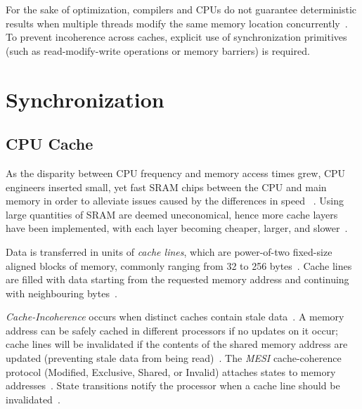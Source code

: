 For the sake of optimization, compilers and CPUs do not guarantee deterministic
results when multiple threads modify the same memory location
concurrently~\citep{drepper2007every}. To prevent incoherence across caches,
explicit use of synchronization primitives (such as read-modify-write
operations or memory barriers) is required.

\section{Synchronization}
\subsection{CPU Cache}
As the disparity between CPU frequency and memory access times grew, 
CPU engineers inserted small, yet fast SRAM chips between the CPU
and main memory in order to alleviate issues caused by the differences in speed
~\citep{cantrill2008real,drepper2007every,perfbook2021}. Using large
quantities of SRAM are deemed uneconomical, hence more cache layers
have been implemented, with each layer becoming cheaper, larger, and slower~\citep{drepper2007every,perfbook2021}.

Data is transferred in units of \emph{cache lines}, which are power-of-two
fixed-size aligned blocks of memory, commonly ranging from 32 to 256
bytes~\citep{perfbook2021_cacheline}. Cache lines are filled with data starting
from the requested memory address and continuing with neighbouring
bytes~\citep{perfbook2021_cacheline}.


\emph{Cache-Incoherence} occurs when distinct caches contain stale
data~\citep{herlihy2020art_cachecoherence}. A memory address
can be safely cached in different processors if no updates on it occur; 
cache lines will be invalidated if the contents of the shared memory address are
updated (preventing stale data from being
read)~\citep{herlihy2020art_cachecoherence}.
The \emph{MESI} cache-coherence protocol (Modified, Exclusive, Shared, or
Invalid) attaches states to memory
addresses~\citep{herlihy2020art_cachecoherence}. State transitions notify
the processor when a cache
line should be invalidated~\citep{herlihy2020art_cachecoherence}.


